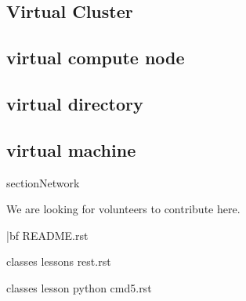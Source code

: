 \documentclass[9pt,twocolumn,twoside]{styles/osajnl}
\begin{document}
\subsection{Virtual Cluster}



\subsection{virtual compute node}



\subsection{virtual directory}



\subsection{virtual machine}


section{Network}

We are looking for volunteers to contribute here.

\appendix

{|bf README.rst}

classes lessons rest.rst

classes lesson python cmd5.rst

\end{document}
